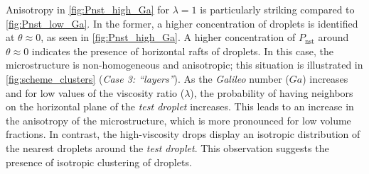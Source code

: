 Anisotropy in \ref{fig:Pnst_high_Ga} for $\lambda=1$ is particularly striking compared to \ref{fig:Pnst_low_Ga}. 
In the former, a higher concentration of droplets is identified at $\theta \approx 0$, as seen in \ref{fig:Pnst_high_Ga}. 
A higher concentration of $P_\text{nst}$ around $\theta \approx 0$ indicates the presence of horizontal rafts of droplets. 
In this case, the microstructure is non-homogeneous and anisotropic; this situation is illustrated in \ref{fig:scheme_clusters} (\textit{Case 3: ``layers''}). 
As the \textit{Galileo} number ($Ga$) increases and for low values of the viscosity ratio ($\lambda$), the probability of having neighbors on the horizontal plane of the \textit{test droplet} increases. 
This leads to an increase in the anisotropy of the microstructure, which is more pronounced for low volume fractions. 
In contrast, the high-viscosity drops display an isotropic distribution of the nearest droplets around the \textit{test droplet}. 
This observation suggests the presence of isotropic clustering of droplets.




